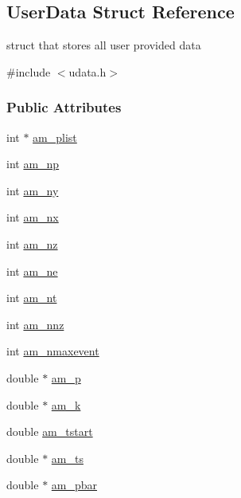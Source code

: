 \hypertarget{struct_user_data}{}\subsection{User\+Data Struct Reference}
\label{struct_user_data}


struct that stores all user provided data  




{\ttfamily \#include $<$udata.\+h$>$}

\subsubsection*{Public Attributes}
\begin{DoxyCompactItemize}
\item 
int $\ast$ \hyperlink{struct_user_data_a122fcb4f213656e29d30e1e8713fcf1c}{am\+\_\+plist}
\item 
int \hyperlink{struct_user_data_a1b32993ff88dfae4dd2aab311c24cc26}{am\+\_\+np}
\item 
int \hyperlink{struct_user_data_a1c8d4eb301c60c34dc4870faca7ce5a4}{am\+\_\+ny}
\item 
int \hyperlink{struct_user_data_a00ba9cf99f8f02b663241bb76b76ce96}{am\+\_\+nx}
\item 
int \hyperlink{struct_user_data_af6f8dfb3615c37e31bc8a1b232d2c99e}{am\+\_\+nz}
\item 
int \hyperlink{struct_user_data_a1ee2e63bd2b30c7196b4984014fbc3a4}{am\+\_\+ne}
\item 
int \hyperlink{struct_user_data_a08ea6ecb241cd86a6f171761a48e27dd}{am\+\_\+nt}
\item 
int \hyperlink{struct_user_data_a43ad1c7f840dc744be4251902a4ae91d}{am\+\_\+nnz}
\item 
int \hyperlink{struct_user_data_adfa3a6bf6b41a27f98cac31557e6930f}{am\+\_\+nmaxevent}
\item 
double $\ast$ \hyperlink{struct_user_data_a1a679b0e8dfea7d284d777c937d8d13e}{am\+\_\+p}
\item 
double $\ast$ \hyperlink{struct_user_data_a7b59855746129befdcfe9f3c8a4d2a4c}{am\+\_\+k}
\item 
double \hyperlink{struct_user_data_a230439d483e6fde07a6fe687219060c2}{am\+\_\+tstart}
\item 
double $\ast$ \hyperlink{struct_user_data_a368434a79bdb1655bef3adc552834ddc}{am\+\_\+ts}
\item 
double $\ast$ \hyperlink{struct_user_data_aa73d75cc02e28bcdf108cbea53e615e9}{am\+\_\+pbar}

\end{DoxyCompactItemize}
